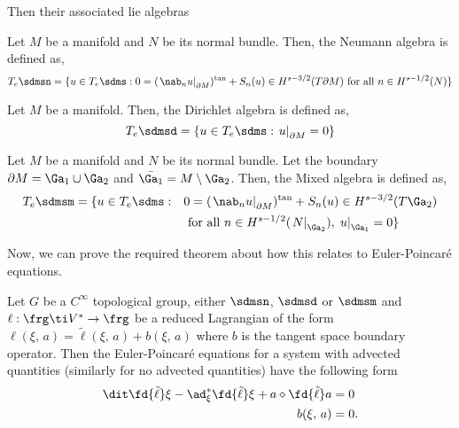 \noindent
Then their associated lie algebras
\begin{ndefi}
  Let $M$ be a manifold and $N$ be its normal bundle. Then, the Neumann algebra is defined as,
  $$ T_e\sdmsn = \{ u \in T_e\sdms : 0 = (\left.\nab_n u\right|_{\partial M})^{\text{tan}} + S_n(u)\in H^{s - 3/2}(T\partial M) \text{ for all } n \in H^{s - 1/2}(N) \} $$
\end{ndefi}
\begin{ndefi}
  Let $M$ be a manifold. Then, the Dirichlet algebra is defined as,
  $$ T_e\sdmsd =  \{ u \in T_e\sdms : \left. u \right|_{\partial M} = 0\} $$
\end{ndefi}
\begin{ndefi}
  Let $M$ be a manifold and $N$ be its normal bundle. Let the boundary $\partial M = \Ga_1 \cup \Ga_2$ and $\bar{\Ga_1} = M \setminus \Ga_2$. Then, the Mixed algebra is defined as,
  \begin{align*}
    T_e\sdmsm = \{ u \in T_e\sdms :\quad &0 = (\left.\nab_n u\right|_{\partial M})^{\text{tan}} + S_n(u)\in H^{s - 3/2}(T\Ga_2)\\
    &\text{ for all } n \in H^{s - 1/2} (\left.N\right|_{\Ga_2}),\, \left. u \right|_{\Ga_1} = 0\}
  \end{align*}
\end{ndefi}
\noindent
Now, we can prove the required theorem about how this relates to Euler-Poincar\'e equations.
\begin{nthm}
  Let $G$ be a $C^\infty$ topological group, either $\sdmsn$, $\sdmsd$ or $\sdmsm$ and $\ell : \frg \ti V^* \to \frg$ be a reduced Lagrangian of the form $\ell(\xi,\, a) = \tilde \ell(\xi,\,a) + b(\xi,\,a)$ where $b$ is the tangent space boundary operator. Then the Euler-Poincar\'e equations for a system with advected quantities (similarly for no advected quantities) have the following form
  \begin{equation}
    \begin{split}
      \dit \fd {\tilde \ell} \xi - \ad_\xi^* \fd {\tilde \ell} \xi + a \diamond \fd {\tilde \ell} a &= 0 \\
      b(\xi,\, a) & =0.
    \end{split}\label{eq:epa_bc}
  \end{equation}
\end{nthm}
